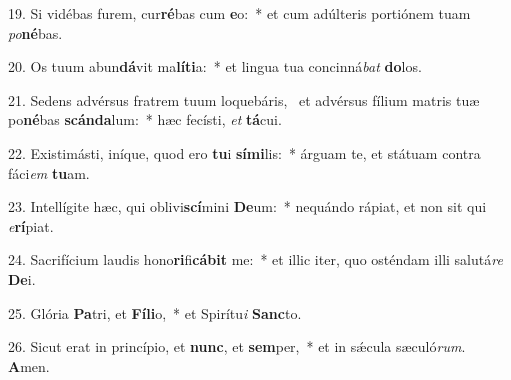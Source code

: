 19. Si vidébas furem, cur\textbf{ré}bas cum \textbf{e}o:~*  et cum adúlteris portiónem tuam \textit{po}\textbf{né}bas.\

20. Os tuum abun\textbf{dá}vit ma\textbf{lí}\textbf{ti}a:~*  et lingua tua concinná\textit{bat} \textbf{do}los.\

21. Sedens advérsus fratrem tuum loquebáris, \dag\  et advérsus fílium matris tuæ po\textbf{né}bas \textbf{scán}\textbf{da}lum:~*  hæc fecísti, \textit{et} \textbf{tá}cui.\

22. Existimásti, iníque, quod ero \textbf{tu}i \textbf{sí}\textbf{mi}lis:~*  árguam te, et státuam contra fáci\textit{em} \textbf{tu}am.\

23. Intellígite hæc, qui oblivi\textbf{scí}mini \textbf{De}um:~*  nequándo rápiat, et non sit qui \textit{e}\textbf{rí}piat.\

24. Sacrifícium laudis hono\textbf{ri}fi\textbf{cá}\textbf{bit} me:~*  et illic iter, quo osténdam illi salutá\textit{re} \textbf{De}i.\

25. Glória \textbf{Pa}tri, et \textbf{Fí}\textbf{li}o,~*  et Spirítu\textit{i} \textbf{Sanc}to.\

26. Sicut erat in princípio, et \textbf{nunc}, et \textbf{sem}per,~*  et in sǽcula sæculó\textit{rum}. \textbf{A}men.\

